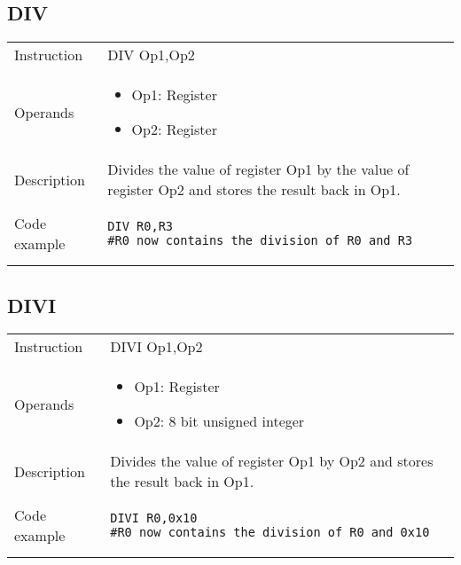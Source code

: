 \subsection{DIV}
\renewcommand*{\arraystretch}{2.0}
\begin{longtable}{P{3cm}P{9cm}}
\midrule
\noindent Instruction & DIV Op1,Op2 \\
\noindent Operands &
\begin{itemize}[label={},noitemsep,leftmargin=*,topsep=0pt,partopsep=0pt, itemsep=1em]
\item Op1: Register
\item Op2: Register
\end{itemize}\\
\noindent Description & Divides the value of register Op1 by the value of register Op2 and stores the result back in Op1.
	 \\
\noindent Code example & 
\begin{lstlisting}
DIV R0,R3
#R0 now contains the division of R0 and R3
\end{lstlisting} \\
\end{longtable}


\subsection{DIVI}
\renewcommand*{\arraystretch}{2.0}
\begin{longtable}{P{3cm}P{9cm}}
\midrule
\noindent Instruction & DIVI Op1,Op2 \\
\noindent Operands &
\begin{itemize}[label={},noitemsep,leftmargin=*,topsep=0pt,partopsep=0pt, itemsep=1em]
\item Op1: Register
\item Op2: 8 bit unsigned integer
\end{itemize}\\
\noindent Description & Divides the value of register Op1 by Op2 and stores the result back in Op1.
	 \\
\noindent Code example & 
\begin{lstlisting}
DIVI R0,0x10
#R0 now contains the division of R0 and 0x10
\end{lstlisting} \\
\end{longtable}

\newpage


